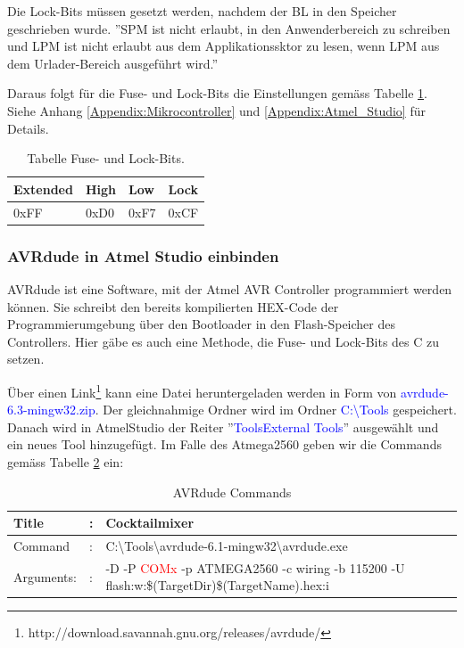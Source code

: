 Die Lock-Bits müssen gesetzt werden, nachdem der BL in den Speicher geschrieben wurde. ''SPM ist nicht erlaubt, in den Anwenderbereich zu schreiben und LPM ist nicht erlaubt aus dem Applikationssktor zu lesen, wenn LPM aus dem Urlader-Bereich ausgeführt wird.''

\newpage
Daraus folgt für die Fuse- und Lock-Bits die Einstellungen gemäss Tabelle \ref{tab:Fuse_und_Lock-Bits}. Siehe Anhang \ref{Appendix:Mikrocontroller} und \ref{Appendix:Atmel_Studio} für Details.

\begin{table}[h!]
\center
\begin{tabular}{|l|l|l|l|}
\hline
\textbf{Extended} & \textbf{High} & \textbf{Low} & \textbf{Lock}\\
\hline
0xFF & 0xD0 & 0xF7 & 0xCF\\
\hline
\end{tabular}
\caption{Tabelle Fuse- und Lock-Bits.}
\label{tab:Fuse_und_Lock-Bits}
\end{table}


\subsubsection{AVRdude in Atmel Studio einbinden}\label{subsubsec:avrdude_in_atmelstudio_einbinden}

AVRdude ist eine Software, mit der Atmel AVR Controller programmiert werden können. Sie schreibt den bereits kompilierten HEX-Code der Programmierumgebung über den Bootloader in den Flash-Speicher des Controllers. Hier gäbe es auch eine Methode, die Fuse- und Lock-Bits des \textmu C zu setzen.


Über einen Link\footnote{http://download.savannah.gnu.org/releases/avrdude/} kann eine Datei heruntergeladen werden in Form von \textcolor{blue}{avrdude-6.3-mingw32.zip}. Der gleichnahmige Ordner wird im Ordner \textcolor{blue}{C:\textbackslash Tools} gespeichert. Danach wird in AtmelStudio der Reiter ''\textcolor{blue}{Tools\textrightarrow External Tools}'' ausgewählt und ein neues Tool hinzugefügt. Im Falle des Atmega2560 geben wir die Commands gemäss Tabelle \ref{tab:AVRdude_commands} ein:

\begin{table}[h!]
\center
\begin{tabularx}{\textwidth}{|l|l|X|}
\hline
Title & : & Cocktailmixer \\
\hline
Command & : & C:\textbackslash Tools\textbackslash avrdude-6.1-mingw32\textbackslash avrdude.exe \\
\hline
Arguments: & : & -D -P \textcolor{red}{ COMx} -p ATMEGA2560 -c wiring -b 115200 -U flash:w:\$(TargetDir)\$(TargetName).hex:i\\
\hline
\end{tabularx}
\caption{AVRdude Commands}
\label{tab:AVRdude_commands}
\end{table}

